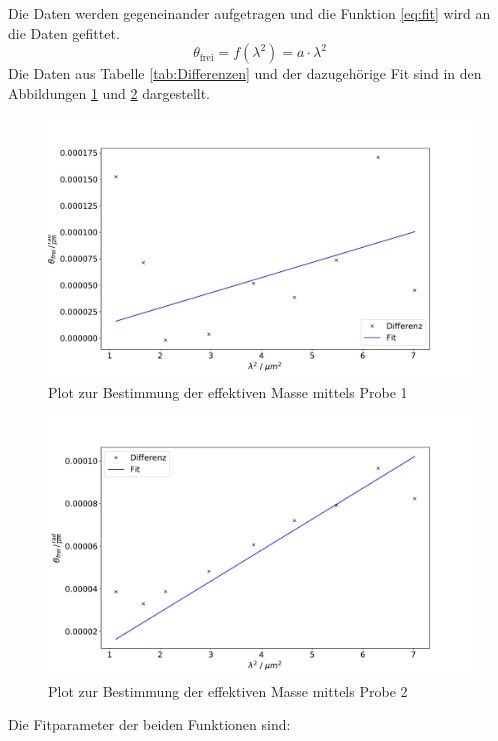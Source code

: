\FloatBarrier
Die Daten werden gegeneinander aufgetragen und die Funktion \eqref{eq:fit} wird an die Daten gefittet.
\begin{equation}
  \label{eq:fit}
  \theta_{\text{frei}} = f(\lambda^2) = a\cdot \lambda^2
\end{equation}
Die Daten aus Tabelle \ref{tab:Differenzen} und der dazugehörige Fit sind in den Abbildungen \ref{fig:fit1} und \ref{fig:fit2} 
dargestellt.
\FloatBarrier
\begin{figure}
  \centering
  \includegraphics[width = \textwidth]{figure/Theta1_diff_plot.pdf}
  \caption{Plot zur Bestimmung der effektiven Masse mittels Probe 1}
  \label{fig:fit1}
\end{figure}
\begin{figure}
  \centering
  \includegraphics[width = \textwidth]{figure/Theta2_diff_plot.pdf}
  \caption{Plot zur Bestimmung der effektiven Masse mittels Probe 2}
  \label{fig:fit2}
\end{figure}
\FloatBarrier
Die Fitparameter der beiden Funktionen sind:
